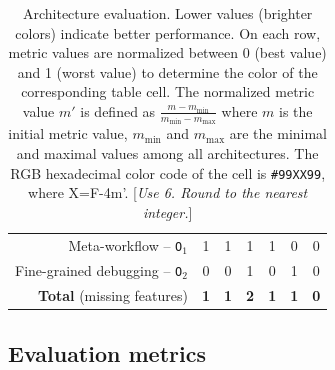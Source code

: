\documentclass[preprint,3p,twocolumn]{elsarticle}
\newcommand{\todo}[1]{\color{blue}\xspace[\emph{#1}]\xspace\color{black}}
\begin{document}
\begin{table}
\begin{tabular}{rcccccc}
  Meta-workflow  -- \texttt{O$_1$}    & \cellcolor[HTML]{99BB99}1
                                     & \cellcolor[HTML]{99BB99}1
                                     & \cellcolor[HTML]{99BB99}1
                                     & \cellcolor[HTML]{99BB99}1
                                     & \cellcolor[HTML]{99FF99}0
                                     & \cellcolor[HTML]{99FF99}0\\
  Fine-grained debugging -- \texttt{O$_2$}   & \cellcolor[HTML]{99FF99}0
                                     & \cellcolor[HTML]{99FF99}0
                                     & \cellcolor[HTML]{99BB99}1
                                     & \cellcolor[HTML]{99FF99}0
                                     & \cellcolor[HTML]{99BB99}1
                                     & \cellcolor[HTML]{99FF99}0\\
  \textbf{Total} (missing features) & \cellcolor[HTML]{99DD99}\textbf{1}
                                     & \cellcolor[HTML]{99DD99}\textbf{1}
                                     & \cellcolor[HTML]{99BB99}\textbf{2}
                                     & \cellcolor[HTML]{99DD99}\textbf{1}
                                     & \cellcolor[HTML]{99DD99}\textbf{1}
                                     & \cellcolor[HTML]{99FF99}\textbf{0}\\
\end{tabular}

\caption{Architecture evaluation. Lower values (brighter colors) indicate better performance. On each row, metric values are
  normalized between 0 (best value) and 1 (worst value) to determine the
  color of the corresponding table cell. The normalized metric value $m'$ is
  defined as
  $\frac{m-m_{\mathrm{min}}}{m_{\mathrm{min}}-m_{\mathrm{max}}}$ where
  $m$ is the initial metric value, $m_{\mathrm{min}}$ and $m_{\mathrm{max}}$
  are the minimal and maximal values among all architectures. The RGB hexadecimal color code of the cell
  is \texttt{\#99XX99}, where X=F-4m'. \todo{Use 6. Round to the nearest integer.}}
\label{table:evaluation}
\end{table}

\subsection{Evaluation metrics}
\end{document}
